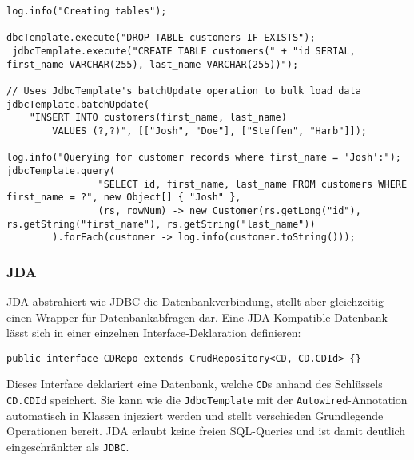 \documentclass{article}
\begin{document}
\begin{lstlisting}
log.info("Creating tables");

dbcTemplate.execute("DROP TABLE customers IF EXISTS");
 jdbcTemplate.execute("CREATE TABLE customers(" + "id SERIAL, first_name VARCHAR(255), last_name VARCHAR(255))");

// Uses JdbcTemplate's batchUpdate operation to bulk load data
jdbcTemplate.batchUpdate(
	"INSERT INTO customers(first_name, last_name)
		VALUES (?,?)", [["Josh", "Doe"], ["Steffen", "Harb"]]);

log.info("Querying for customer records where first_name = 'Josh':");
jdbcTemplate.query(
                "SELECT id, first_name, last_name FROM customers WHERE first_name = ?", new Object[] { "Josh" },
                (rs, rowNum) -> new Customer(rs.getLong("id"), rs.getString("first_name"), rs.getString("last_name"))
        ).forEach(customer -> log.info(customer.toString()));
\end{lstlisting}

\subsubsection{JDA}

JDA abstrahiert wie JDBC die Datenbankverbindung, stellt aber gleichzeitig einen Wrapper für Datenbankabfragen dar. Eine JDA-Kompatible Datenbank lässt sich in einer einzelnen Interface-Deklaration definieren:

\begin{lstlisting}
public interface CDRepo extends CrudRepository<CD, CD.CDId> {}
\end{lstlisting}

Dieses Interface deklariert eine Datenbank, welche \texttt{CD}s anhand des Schlüssels \texttt{CD.CDId} speichert. Sie kann wie die \texttt{JdbcTemplate} mit der \texttt{Autowired}-Annotation automatisch in Klassen injeziert werden und stellt verschieden Grundlegende Operationen bereit. JDA erlaubt keine freien SQL-Queries und ist damit deutlich eingeschränkter als \texttt{JDBC}.
\end{document}
